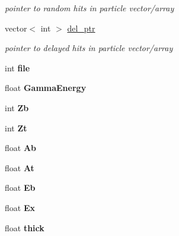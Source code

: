 \begin{DoxyCompactItemize}
\begin{DoxyCompactList}\small\item\em pointer to random hits in particle vector/array \end{DoxyCompactList}\item 
\hypertarget{classg__clx_a8514273470549549d94417e7cade9b82}{vector$<$ int $>$ \hyperlink{classg__clx_a8514273470549549d94417e7cade9b82}{del\-\_\-ptr}}\label{classg__clx_a8514273470549549d94417e7cade9b82}

\begin{DoxyCompactList}\small\item\em pointer to delayed hits in particle vector/array \end{DoxyCompactList}\item 
\hypertarget{classg__clx_a4b7f5bc375e032d31bebb6ba34cb328f}{int {\bfseries file}}\label{classg__clx_a4b7f5bc375e032d31bebb6ba34cb328f}

\item 
\hypertarget{classg__clx_aade220d336f2c91d09b4da5a14138436}{float {\bfseries Gamma\-Energy}}\label{classg__clx_aade220d336f2c91d09b4da5a14138436}

\item 
\hypertarget{classg__clx_a10f3a51541a437abeafdde5e4d919296}{int {\bfseries Zb}}\label{classg__clx_a10f3a51541a437abeafdde5e4d919296}

\item 
\hypertarget{classg__clx_af3a63ef9a4e0e92e6646ec8c9e86cd2d}{int {\bfseries Zt}}\label{classg__clx_af3a63ef9a4e0e92e6646ec8c9e86cd2d}

\item 
\hypertarget{classg__clx_a9806f6d9aa4ecd6daeccd1f8184bbb5e}{float {\bfseries Ab}}\label{classg__clx_a9806f6d9aa4ecd6daeccd1f8184bbb5e}

\item 
\hypertarget{classg__clx_a0a85cb0adca7a54ed29ebda550b36dcc}{float {\bfseries At}}\label{classg__clx_a0a85cb0adca7a54ed29ebda550b36dcc}

\item 
\hypertarget{classg__clx_adacfaa00cabbde7095f23a1cacab7510}{float {\bfseries Eb}}\label{classg__clx_adacfaa00cabbde7095f23a1cacab7510}

\item 
\hypertarget{classg__clx_a1f2096a705a986c48af8540f6eb1b835}{float {\bfseries Ex}}\label{classg__clx_a1f2096a705a986c48af8540f6eb1b835}

\item 
\hypertarget{classg__clx_ada5b4790b6f1970cd350444564604e2f}{float {\bfseries thick}}\label{classg__clx_ada5b4790b6f1970cd350444564604e2f}


\end{DoxyCompactItemize}
